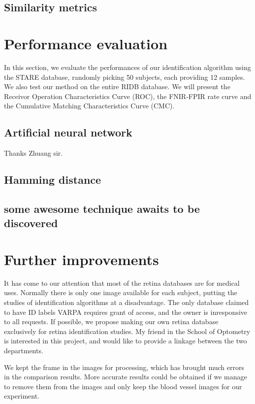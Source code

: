 \documentclass[a4paper,11pt]{article}
\theoremstyle{plain} %
\begin{document}
\subsection{Similarity metrics}


\section{Performance evaluation}

In this section, we evaluate the performances of our identification algorithm using the STARE database, randomly picking 50 subjects, each providing 12 samples. We also test our method on the entire RIDB database. We will present the Receivor Operation Characteristics Curve (ROC), the FNIR-FPIR rate curve and the Cumulative Matching Characteristics Curve (CMC).


\subsection{Artificial neural network}
Thanks Zhuang sir.
\subsection{Hamming distance}

\subsection{some awesome technique awaits to be discovered}



\section{Further improvements}
It has come to our attention that most of the retina databases are for medical uses. Normally there is only one image available for each subject, putting the studies of identification algorithms at a disadvantage. The only database claimed to have ID labels VARPA requires grant of access, and the owner is inresponsive to all requests. If possible, we propose making our own retina database exclusively for retina identification studies. My friend in the School of Optometry is interested in this project, and would like to provide a linkage between the two departments.

We kept the frame in the images for processing, which has brought much errors in the comparison results. More accurate results could be obtained if we manage to remove them from the images and only keep the blood vessel images for our experiment.
\end{document}
